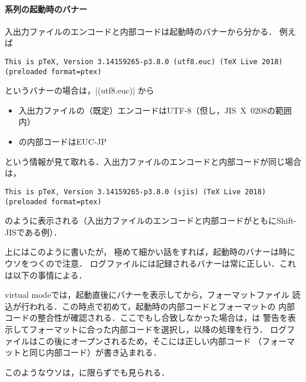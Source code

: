 \documentclass[a4paper,11pt,nomag,dvipdfmx]{jsarticle}
\begin{document}
\paragraph{\pTeX 系列の起動時のバナー}
入出力ファイルのエンコードと内部コードは起動時のバナーから分かる．
例えば
\begin{verbatim}
This is pTeX, Version 3.14159265-p3.8.0 (utf8.euc) (TeX Live 2018)
(preloaded format=ptex)
\end{verbatim}
というバナーの場合は，|(utf8.euc)| から
\begin{itemize}
 \item 入出力ファイルの（既定）エンコードはUTF-8（但し，JIS~X~0208の範囲内）
 \item \pTeX の内部コードはEUC-JP
\end{itemize}
という情報が見て取れる．入出力ファイルのエンコードと内部コードが同じ場合は，
\begin{verbatim}
This is pTeX, Version 3.14159265-p3.8.0 (sjis) (TeX Live 2018)
(preloaded format=ptex)
\end{verbatim}
のように表示される（入出力ファイルのエンコードと内部コードがともにShift-JISである例）．

\begin{dangerous}
上にはこのように書いたが，
極めて細かい話をすれば，起動時のバナーは時にウソをつくので注意．
ログファイルには記録されるバナーは常に正しい．これは以下の事情による．

virtual modeでは，起動直後にバナーを表示してから，フォーマットファイル
読込が行われる．この時点で初めて，起動時の内部コードとフォーマットの
内部コードの整合性が確認される．ここでもし合致しなかった場合は，\pTeX は
警告を表示してフォーマットに合った内部コードを選択し，以降の処理を行う．
ログファイルはこの後にオープンされるため，そこには正しい内部コード
（フォーマットと同じ内部コード）が書き込まれる\cite{tjb55}．

このようなウソは，\pTeX に限らずでも見られる．
\end{dangerous}
\end{document}
